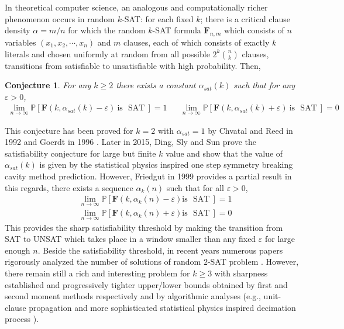 \documentclass[11pt,reqno]{amsart}
\numberwithin{equation}{section}
\renewcommand{\vec}[1]{\boldsymbol{#1}}
\newcommand\vF{\vec F}
\newcommand\pr{\mathbb{P}}
\renewcommand\Pr{\pr}
\newtheorem{conjecture}[definition]{Conjecture}
\def\pr{{\mathbb P}}
\begin{document}
	In theoretical computer science, an analogous and computationally richer phenomenon occurs in random $k$-SAT: for each fixed $k$; there is a critical clause density  $\alpha=m/n$ for which the random $k$-SAT formula $\vF_{n,m}$ which consists of $n$ variables $\left(x_1,x_2,\cdots,x_n\right)$ and $m$ clauses, each of which consists of exactly $k$ literals and chosen uniformly at random from all possible $2^{k}\binom{n}{k}$ clauses, transitions from satisfiable to unsatisfiable with high probability.
	Then,
	\begin{conjecture}
		For any $k\ge 2$ there exists a constant $\alpha_{sat}(k)$ such that for any $\varepsilon>0$,
		\begin{align*}
			\lim_{n\to\infty} \Pr[\vF(k,\alpha_{sat}(k)-\varepsilon) ~\mbox{is ~SAT}~]=1 && \quad \lim_{n\to\infty} \Pr[\vF(k,\alpha_{sat}(k)+\varepsilon) ~\mbox{is ~SAT}~]=0
		\end{align*}
	\end{conjecture}
	This conjecture has been proved for $k=2$ with $\alpha_{sat}=1$ by Chvatal and Reed in 1992 \cite{CR} and Goerdt in 1996 \cite{Goerdt}.
	Later in 2015, Ding, Sly and Sun \cite{DSS} prove the satisfiability conjecture for large but finite $k$ value and show that the value of $\alpha_{sat}(k)$ is given by the statistical physics inspired one step symmetry breaking cavity method prediction.
	However, Friedgut in 1999 \cite{Friedgut} provides a partial result in this regards, there exists a sequence $\alpha_{k}(n)$ such that for all $\varepsilon>0$,
	\begin{align*}
		&\lim_{n\to\infty} \Pr[\vF(k,\alpha_{k}(n)-\varepsilon) \mbox{is ~SAT}~]=1 \\ 
		&\lim_{n\to\infty} \Pr[\vF(k,\alpha_{k}(n)+\varepsilon) \mbox{is ~SAT}~]=0
	\end{align*}
	This provides the sharp satisfiability threshold by making the transition from SAT to UNSAT which takes place in a window smaller than any fixed $\varepsilon$ for large enough $n$.
	Beside the satisfiability threshold, in recent years numerous papers rigorously analyzed the number of solutions of random $2$-SAT problem \cite{2sat,Chatterjee1}. 
	However, there remain still a rich and interesting problem for $k\geq 3$ with sharpness established and progressively tighter upper/lower bounds obtained by first and second moment methods \cite{nae,yuval} respectively and by algorithmic analyses \cite{Achlioptas1,BFU,CF} (e.g., unit-clause propagation and more sophisticated statistical physics inspired decimation process \cite{Chatterjee2, Angelica}).
	
\end{document}
